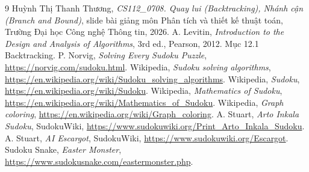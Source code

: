 \documentclass[12pt, a4paper]{report}
\begin{document}
\begingroup
\raggedright
\begin{thebibliography}{9}
   Huỳnh Thị Thanh Thương, \emph{CS112\_0708. Quay lui (Backtracking), Nhánh cận (Branch and Bound)}, slide bài giảng môn Phân tích và thiết kế thuật toán, Trường Đại học Công nghệ Thông tin, 2026.
   A. Levitin, \emph{Introduction to the Design and Analysis of Algorithms}, 3rd ed., Pearson, 2012. Mục 12.1 Backtracking.
   P. Norvig, \emph{Solving Every Sudoku Puzzle}, \url{https://norvig.com/sudoku.html}.
   Wikipedia, \emph{Sudoku solving algorithms}, \url{https://en.wikipedia.org/wiki/Sudoku_solving_algorithms}.
   Wikipedia, \emph{Sudoku}, \url{https://en.wikipedia.org/wiki/Sudoku}.
   Wikipedia, \emph{Mathematics of Sudoku}, \url{https://en.wikipedia.org/wiki/Mathematics_of_Sudoku}.
   Wikipedia, \emph{Graph coloring}, \url{https://en.wikipedia.org/wiki/Graph_coloring}.
   A. Stuart, \emph{Arto Inkala Sudoku}, SudokuWiki, \url{https://www.sudokuwiki.org/Print_Arto_Inkala_Sudoku}.
   A. Stuart, \emph{AI Escargot}, SudokuWiki, \url{https://www.sudokuwiki.org/Escargot}.
   Sudoku Snake, \emph{Easter Monster}, \url{https://www.sudokusnake.com/eastermonster.php}.
\end{thebibliography}
\endgroup
\end{document}
